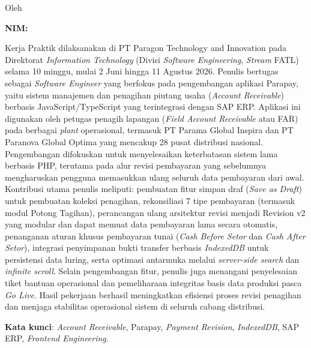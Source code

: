 \clearpage
{}
\begin{center}
{\bfseries\normalsize \JudulLaporan\par}
\vspace{0.1cm}
{\bfseries\normalsize \TempatKP\par}
\vspace{0.2cm}
{Oleh\par
\bfseries\normalsize \NamaMahasiswa\par
\bfseries\normalsize NIM: \NIM\par}
\end{center}
\vspace{0.3cm}

Kerja Praktik dilaksanakan di PT Paragon Technology and Innovation pada Direktorat \textit{Information Technology} (Divisi \textit{Software Engineering}, \textit{Stream} FATL) selama 10 minggu, mulai 2 Juni hingga 11 Agustus 2026. Penulis bertugas sebagai \textit{Software Engineer} yang berfokus pada pengembangan aplikasi Parapay, yaitu sistem manajemen dan penagihan piutang usaha (\textit{Account Receivable}) berbasis JavaScript/TypeScript yang terintegrasi dengan SAP ERP. Aplikasi ini digunakan oleh petugas penagih lapangan (\textit{Field Account Receivable} atau FAR) pada berbagai \textit{plant} operasional, termasuk PT Parama Global Inspira dan PT Paranova Global Optima yang mencakup 28 pusat distribusi nasional. Pengembangan difokuskan untuk menyelesaikan keterbatasan sistem lama berbasis PHP, terutama pada alur revisi pembayaran yang sebelumnya mengharuskan pengguna memasukkan ulang seluruh data pembayaran dari awal. Kontribusi utama penulis meliputi: pembuatan fitur simpan draf (\textit{Save as Draft}) untuk pembuatan koleksi penagihan, rekonsiliasi 7 tipe pembayaran (termasuk modul Potong Tagihan), perancangan ulang arsitektur revisi menjadi Revision v2 yang modular dan dapat memuat data pembayaran lama secara otomatis, penanganan aturan khusus pembayaran tunai (\textit{Cash Before Setor} dan \textit{Cash After Setor}), integrasi penyimpanan bukti transfer berbasis \textit{IndexedDB} untuk persistensi data luring, serta optimasi antarmuka melalui \textit{server-side search} dan \textit{infinite scroll}. Selain pengembangan fitur, penulis juga menangani penyelesaian tiket bantuan operasional dan pemeliharaan integritas basis data produksi pasca \textit{Go Live}. Hasil pekerjaan berhasil meningkatkan efisiensi proses revisi penagihan dan menjaga stabilitas operasional sistem di seluruh cabang distribusi.

\vspace{0.3cm}
\noindent\textbf{Kata kunci}: \textit{Account Receivable}, Parapay, \textit{Payment Revision}, \textit{IndexedDB}, SAP ERP, \textit{Frontend Engineering}.
